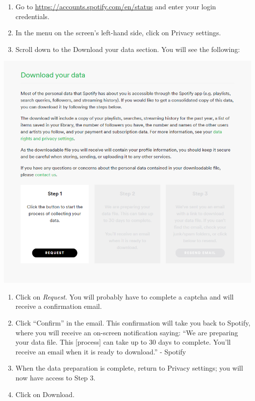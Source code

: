 \documentclass[
  11pt,
]{book}
\providecommand{\tightlist}{%
  \setlength{\itemsep}{0pt}\setlength{\parskip}{0pt}}
\begin{document}
\begin{enumerate}
\def\labelenumi{\arabic{enumi}.}
\tightlist
\item
  Go to \url{https://accounts.spotify.com/en/status} and enter your login credentials.
\item
  In the menu on the screen's left-hand side, click on Privacy settings.
\item
  Scroll down to the Download your data section. You will see the following:
\end{enumerate}

\begin{center}\includegraphics[width=1\linewidth]{splots/spotify} \end{center}

\begin{enumerate}
\def\labelenumi{\arabic{enumi}.}
\setcounter{enumi}{3}
\tightlist
\item
  Click on \emph{Request}. You will probably have to complete a captcha and will receive a confirmation email.
\item
  Click ``Confirm'' in the email. This confirmation will take you back to Spotify, where you will receive an on-screen notification saying: ``We are preparing your data file. This {[}process{]} can take up to 30 days to complete. You'll receive an email when it is ready to download.'' - Spotify
\item
  When the data preparation is complete, return to Privacy settings; you will now have access to Step 3.
\item
  Click on Download.
\end{enumerate}
\end{document}

